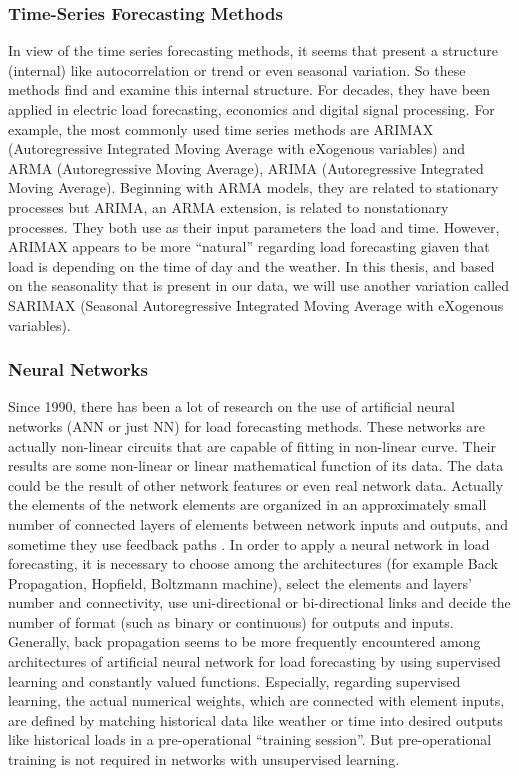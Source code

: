\subsubsection{Time-Series Forecasting Methods}
In view of the time series forecasting methods, it seems that present a structure (internal) like autocorrelation or trend or even seasonal variation. So these methods find and examine this internal structure. For decades, they have been applied in electric load forecasting, economics and digital signal processing. For example, the most commonly used time series methods are ARIMAX (Autoregressive Integrated Moving Average with eXogenous variables) and ARMA (Autoregressive Moving Average), ARIMA (Autoregressive Integrated Moving Average). Beginning with ARMA models, they are related to stationary processes but ARIMA, an ARMA extension, is related to nonstationary processes. They both use as their input parameters the load and time. However, ARIMAX appears to be more “natural” regarding load forecasting giaven that load is depending on the time of day and the weather. In this thesis, and based on the seasonality that is present in our data, we will use another variation called SARIMAX (Seasonal Autoregressive Integrated Moving Average with eXogenous variables).

\subsubsection{Neural Networks}
Since 1990, there has been a lot of research on the use of artificial neural networks (ANN or just NN) for load forecasting methods. These networks are actually non-linear circuits that are capable of fitting in non-linear curve. Their results are some non-linear or linear mathematical function of its data. The data could be the result of other network features or even real network data. Actually the elements of the network elements are organized in an approximately small number of connected layers of elements between network inputs and outputs, and sometime they use feedback paths \cite{soliman2010electrical}. In order to apply a neural network in load forecasting, it is necessary to choose among the architectures (for example Back Propagation, Hopfield, Boltzmann machine), select the elements and layers’ number and connectivity, use uni-directional or bi-directional links and decide the number of format (such as binary or continuous) for outputs and inputs. Generally, back propagation seems to be more frequently encountered among architectures of artificial neural network for load forecasting by using supervised learning and constantly valued functions. Especially, regarding supervised learning, the actual numerical weights, which are connected with element inputs, are defined by matching historical data like weather or time into desired outputs like historical loads in a pre-operational “training session”. But pre-operational training is not required in networks with unsupervised learning.
